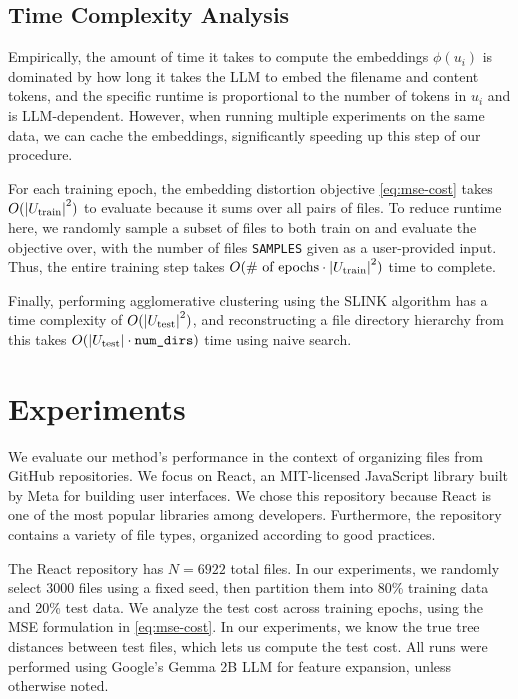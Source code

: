\documentclass{article}
\begin{document}
\subsection{Time Complexity Analysis}

Empirically, the amount of time it takes to compute the embeddings $\phi(u_i)$ is dominated by how long it takes the LLM to embed the filename and content tokens, and the specific runtime is proportional to the number of tokens in $u_i$ and is LLM-dependent. However, when running multiple experiments on the same data, we can cache the embeddings, significantly speeding up this step of our procedure.

For each training epoch, the embedding distortion objective \eqref{eq:mse-cost} takes $O(\abs{U_\text{train}}^2)$ to evaluate because it sums over all pairs of files. To reduce runtime here, we randomly sample a subset of files to both train on and evaluate the objective over, with the number of files \texttt{SAMPLES} given as a user-provided input. Thus, the entire training step takes $O(\text{\# of epochs} \cdot \abs{U_\text{train}}^2)$ time to complete.

Finally, performing agglomerative clustering using the SLINK algorithm \cite{sibson1973slink} has a time complexity of $O(\abs{U_\text{test}}^2)$, and reconstructing a file directory hierarchy from this takes $O(\abs{U_\text{test}} \cdot \texttt{num\_dirs})$ time using naive search.

\section{Experiments}

We evaluate our method's performance in the context of organizing files from GitHub repositories. We focus on React, an MIT-licensed JavaScript library built by Meta for building user interfaces. We chose this repository because React is one of the most popular libraries among developers. Furthermore, the repository contains a variety of file types, organized according to good practices.

The React repository has $N=6922$ total files. In our experiments, we randomly select 3000 files using a fixed seed, then partition them into 80\% training data and 20\% test data. We analyze the test cost across training epochs, using the MSE formulation in \eqref{eq:mse-cost}. In our experiments, we know the true tree distances between test files, which lets us compute the test cost. All runs were performed using Google's Gemma 2B LLM for feature expansion, unless otherwise noted.
\end{document}
